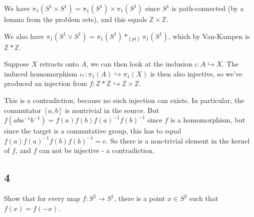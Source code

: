 \begin{solution}

We have \(\pi_1(S^1 \times S^1) = \pi_1(S^1) \times\pi_1(S^1)\) since
\(S^1\) is path-connected (by a lemma from the problem sets), and this
equals \({\mathbb{Z}}\times{\mathbb{Z}}\).

We also have
\(\pi_1(S^1 \vee S^1) = \pi_1(S^1) \ast_{\left\{{pt}\right\}} \pi_1(S^1)\),
which by Van-Kampen is \({\mathbb{Z}}\ast {\mathbb{Z}}\).

Suppose \(X\) retracts onto \(A\), we can then look at the inclusion
\(\iota: A \hookrightarrow X\). The induced homomorphism
\(\iota_*: \pi_1(A) \hookrightarrow\pi_1(X)\) is then also injective, so
we've produced an injection from
\(f: {\mathbb{Z}}\ast {\mathbb{Z}}\hookrightarrow{\mathbb{Z}}\times{\mathbb{Z}}\).

This is a contradiction, because no such injection can exists. In
particular, the commutator \([a,b]\) is nontrivial in the source. But
\(f(aba^{-1}b^{-1}) = f(a)f(b)f(a)^{-1}f(b)^{-1}\) since \(f\) is a
homomorphism, but since the target is a commutative group, this has to
equal \(f(a)f(a)^{-1} f(b)f(b)^{-1} = e\). So there is a non-trivial
element in the kernel of \(f\), and \(f\) can not be injective - a
contradiction.

\end{solution}

\hypertarget{section-17}{%
\subsection{4}\label{section-17}}

Show that for every map \(f: S^2 \to S^1\), there is a point
\(x\in S^2\) such that \(f(x) = f(-x)\).

